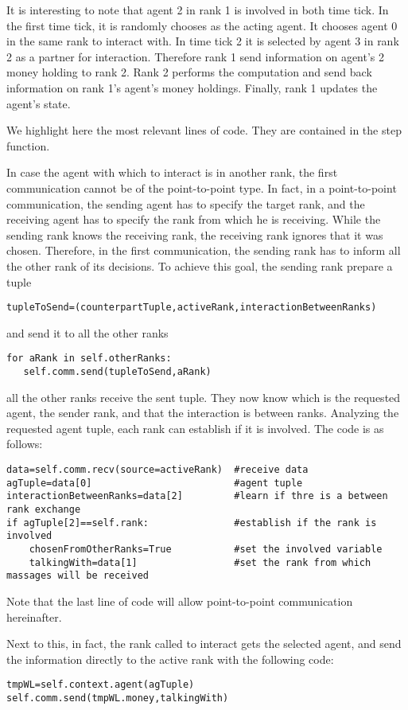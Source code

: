 \documentclass{article}
\begin{document}
It is interesting to note that agent 2 in rank 1 is involved in both time tick.
In the first time tick, it is randomly chooses as the acting agent. It chooses agent 0 in the same rank to interact with.
In time tick 2 it is selected by agent 3 in rank 2 as a partner for interaction. Therefore rank 1 send information on agent's 2 money holding to rank 2.
Rank 2 performs the computation and send back information on rank 1's agent's money holdings. Finally, rank 1 updates the agent's state.

We highlight here the most relevant lines of code. They are contained in the step function.  

In case the agent with which to interact is in another rank, the first communication cannot be of the point-to-point type. In fact, in a point-to-point communication, the sending agent has to specify the target rank, and the receiving agent has to specify the rank from which he is receiving. While the sending rank knows the receiving rank, the receiving rank ignores that it was chosen. Therefore, in the first communication, the sending rank has to inform all the other rank of its decisions. To achieve this goal, the sending rank prepare a tuple 
\begin{verbatim}
tupleToSend=(counterpartTuple,activeRank,interactionBetweenRanks)
\end{verbatim}
and send it to all the other ranks
\begin{verbatim}
for aRank in self.otherRanks:
   self.comm.send(tupleToSend,aRank)
\end{verbatim}
all the other ranks receive the sent tuple. They now know which is the requested agent, the sender rank, and that the interaction is between ranks.
Analyzing the requested agent tuple, each rank can establish if it is involved. The code is as follows:
\begin{verbatim}
data=self.comm.recv(source=activeRank)  #receive data
agTuple=data[0]                         #agent tuple
interactionBetweenRanks=data[2]         #learn if thre is a between rank exchange
if agTuple[2]==self.rank:               #establish if the rank is involved
    chosenFromOtherRanks=True           #set the involved variable
    talkingWith=data[1]                 #set the rank from which massages will be received
\end{verbatim}
Note that the last line of code will allow point-to-point communication hereinafter.

Next to this, in fact, the rank called to interact gets the selected agent, and send the information directly to the active rank with the following code:
\begin{verbatim}
tmpWL=self.context.agent(agTuple)
self.comm.send(tmpWL.money,talkingWith)
\end{verbatim}             
\end{document}
